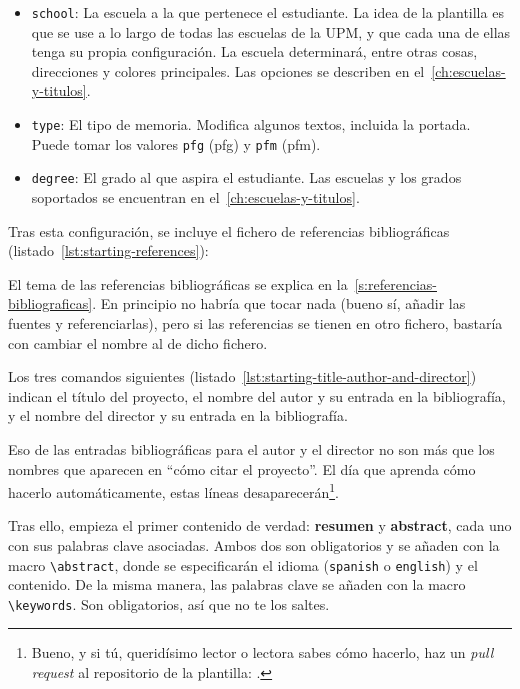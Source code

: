 \begin{itemize}
    \item \texttt{school}: La escuela a la que pertenece el estudiante. La idea de la plantilla es que se use a lo largo de todas las escuelas de la UPM, y que cada una de ellas tenga su propia configuración. La escuela determinará, entre otras cosas, direcciones y colores principales. Las opciones se describen en el~\autoref{ch:escuelas-y-titulos}.
    \item \texttt{type}: El tipo de memoria. Modifica algunos textos, incluida la portada. Puede tomar los valores \texttt{pfg} (\acrlong{pfg}) y \texttt{pfm}  (\acrlong{pfm}).
    \item \texttt{degree}: El grado al que aspira el estudiante. Las escuelas y los grados soportados se encuentran en el~\autoref{ch:escuelas-y-titulos}.
\end{itemize}

Tras esta configuración, se incluye el fichero de referencias bibliográficas (listado~\ref{lst:starting-references}):



El tema de las referencias bibliográficas se explica en la~\autoref{s:referencias-bibliograficas}. En principio no habría que tocar nada (bueno sí, añadir las fuentes y referenciarlas), pero si las referencias se tienen en otro fichero, bastaría con cambiar el nombre al de dicho fichero.

Los tres comandos siguientes (listado~\ref{lst:starting-title-author-and-director}) indican el título del proyecto, el nombre del autor y su entrada en la bibliografía, y el nombre del director y su entrada en la bibliografía.



Eso de las entradas bibliográficas para el autor y el director no son más que los nombres que aparecen en \enquote{cómo citar el proyecto}. El día que aprenda cómo hacerlo automáticamente, estas líneas desaparecerán\footnote{Bueno, y si tú, queridísimo lector o lectora sabes cómo hacerlo, haz un \textit{pull request} al repositorio de la plantilla: \href{\templaterepository}{\templaterepository}.}.

Tras ello, empieza el primer contenido de verdad: \textbf{resumen} y \textbf{abstract}, cada uno con sus palabras clave asociadas. Ambos dos son obligatorios y se añaden con la macro \lstinline{\abstract}, donde se especificarán el idioma (\texttt{spanish} o \texttt{english}) y el contenido. De la misma manera, las palabras clave se añaden con la macro \lstinline{\keywords}. Son obligatorios, así que no te los saltes.

